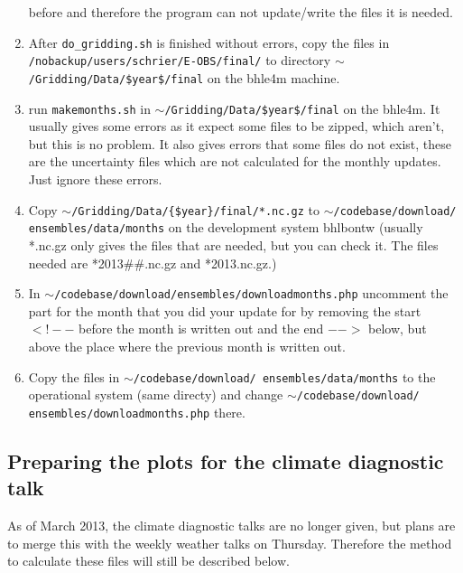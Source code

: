 \documentclass[a4paper]{article}
\begin{document}
\begin{enumerate}
  before and therefore the program can not update/write the files it
  is needed.
\item After \texttt{do\_gridding.sh} is finished without errors, copy
  the files in \texttt{/nobackup/\linebreak users/schrier/E-OBS/final/} to
  directory \texttt{$\sim$/Gridding/Data/\$year\$/final} on the bhle4m
  machine.
\item run \texttt{makemonths.sh} in
  \texttt{$\sim$/Gridding/Data/\$year\$/final} on the bhle4m. It
  usually gives some errors as it expect some files to be zipped,
  which aren't, but this is no problem. It also gives errors that some
  files do not exist, these are the uncertainty files which are not
  calculated for the monthly updates. Just ignore these errors.
\item Copy \texttt{$\sim$/Gridding/Data/\{\$year\}/final/*.nc.gz} to
  \texttt{$\sim$/codebase/download/ ensembles/data/months} on the
  development system bhlbontw (usually *.nc.gz only gives the files
  that are needed, but you can check it. The files needed are
  *2013\#\#.nc.gz and *2013.nc.gz.)
\item In
  \texttt{$\sim$/codebase/download/ensembles/downloadmonths.php}
  uncomment the part for the month that you did your update for by
  removing the start $<!--$ before the month is written out and the
  end $-->$ below, but above the place where the previous month is
  written out.
\item Copy the files in
  \texttt{$\sim$/codebase/download/ ensembles/data/months} to the
  operational system (same directy) and change
  \texttt{$\sim$/codebase/download/ ensembles/downloadmonths.php}
  there.
\end{enumerate}

\subsection{Preparing the plots for the climate diagnostic talk}

As of March 2013, the climate diagnostic talks are no longer given,
but plans are to merge this with the weekly weather talks on
Thursday. Therefore the method to calculate these files will still be
described below.
\end{document}
